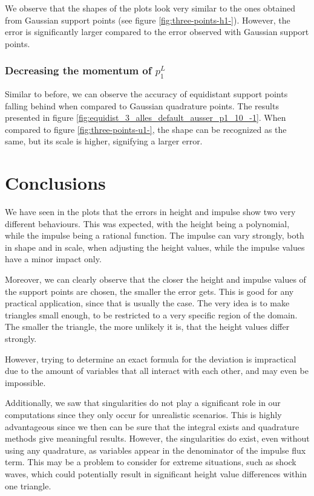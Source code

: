 \documentclass{article}
\begin{document}


We observe that the shapes of the plots look very similar to the ones obtained from Gaussian support points (see figure \ref{fig:three-points-h1-}). However, the error is significantly larger compared to the error observed with Gaussian support points.

\subsubsection{Decreasing the momentum of $p_1^L$}
\label{sec:equidist-3-on-point-var-decr-momentum-p1}



Similar to before, we can observe the accuracy of equidistant support points falling behind when compared to Gaussian quadrature points.
The results presented in figure \ref{fig:equidist_3_alles_default_ausser_p1_10_-1}.
When compared to figure \ref{fig:three-points-u1-}, the shape can be recognized as the same, but its scale is higher, signifying a larger error.

\clearpage{}

\section{Conclusions}
\label{sec:conslusions}

We have seen in the plots that the errors in height and impulse show two very different behaviours.
This was expected, with the height being a polynomial, while the impulse being a rational function.
The impulse can vary strongly, both in shape and in scale, when adjusting the height values, while the impulse values have a minor impact only.

Moreover, we can clearly observe that the closer the height and impulse values of the support points are chosen, the smaller the error gets.
This is good for any practical application, since that is usually the case.
The very idea is to make triangles small enough, to be restricted to a very specific region of the domain.
The smaller the triangle, the more unlikely it is, that the height values differ strongly.

However, trying to determine an exact formula for the deviation is impractical due to the amount of variables that all interact with each other, and may even be impossible.

Additionally, we saw that singularities do not play a significant role in our computations since they only occur for unrealistic scenarios.
This is highly advantageous since we then can be sure that the integral exists and quadrature methods give meaningful results.
However, the singularities do exist, even without using any quadrature, as variables appear in the denominator of the impulse flux term.
This may be a problem to consider for extreme situations, such as shock waves, which could potentially result in significant height value differences within one triangle.
\end{document}
